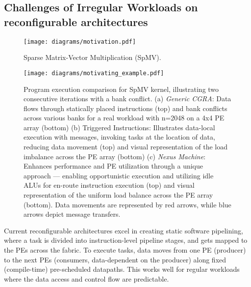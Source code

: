 \subsection{Challenges of Irregular Workloads on reconfigurable architectures}
\label{section:nexusmachine_motivation}
\noindent
\begin{figure}[t!]
	\scriptsize
	\centering	\texttt{[image: diagrams/motivation.pdf]}
    \vspace{-0.2cm}
	\caption{Sparse Matrix-Vector Multiplication (SpMV).} 
	\label{fig:motivation}
\end{figure}
\noindent
\begin{figure*}[h!]
	\scriptsize
	\centering
	\texttt{[image: diagrams/motivating\_example.pdf]}
    \vspace{-0.25cm}
	\caption{Program execution comparison for SpMV kernel, illustrating two consecutive iterations with a bank conflict. (a) \textit{Generic CGRA}: Data flows through statically placed instructions (top) and bank conflicts across various banks for a real workload with n=2048 on a 4x4 PE array (bottom) (b) Triggered Instructions: Illustrates data-local execution with messages, invoking tasks at the location of data, reducing data movement (top) and visual representation of the load imbalance across the PE array (bottom) (c) \textit{Nexus Machine}: Enhances performance and PE utilization through a unique approach — enabling opportunistic execution and utilizing idle ALUs for en-route instruction execution (top) and visual representation of the uniform load balance across the PE array (bottom). Data movements are represented by {\color{red} red} arrows, while {\color{blue} blue} arrows depict message transfers.} 
    \label{fig:walkthrough}
    \vspace{-.3cm}
\end{figure*}
Current reconfigurable architectures excel in creating static software pipelining, where a task is divided into instruction-level pipeline stages, and gets mapped to the PEs across the fabric.
To execute tasks, data moves from one PE (producer) to the next PEs (consumers, data-dependent on the producer) along fixed (compile-time) pre-scheduled datapaths. 
This works well for regular workloads where the data access and control flow are predictable.

